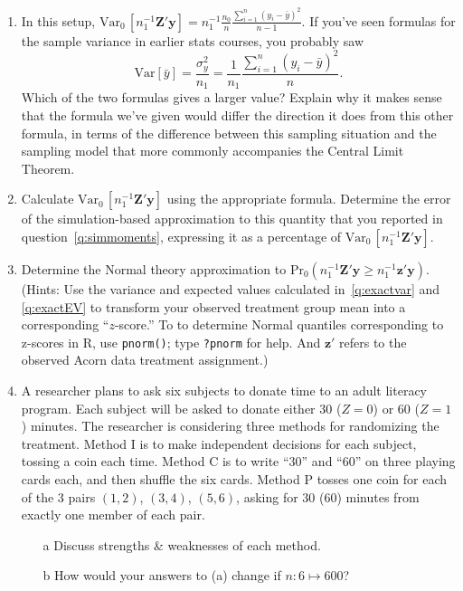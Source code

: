 \documentclass{article}
\begin{document}
\begin{enumerate}
\item In this setup, $\mathrm{Var}_{0}\, [n_{1}^{-1}\mathbf{Z}'\mathbf{y}]  = n_{1}^{-1}
  \frac{n_{0}}{n} \frac{\sum_{i=1}^{n} (y_{i} - \bar y)^{2}}{n-1} $.
  If you've seen formulas for the sample variance in earlier stats
  courses, you probably saw
  $$
  \mathrm{Var} \left[\bar{y}\right] = \frac{\sigma_{y}^{2}}{n_{1}} = \frac{1}{n_{1}}
  \frac{\sum_{i=1}^{n} (y_{i} - \bar y)^{2}}{n} .
  $$
Which of the two formulas gives a larger value?  Explain why it makes
sense that the formula we've given would differ the direction it does
from this other formula, in terms of the difference between this
sampling situation and the sampling model that more commonly
accompanies the Central Limit Theorem.
\item Calculate $\mathrm{Var}_{0}\, [n_{1}^{-1}\mathbf{Z}'\mathbf{y}]$ using the appropriate
  formula.   Determine the error of the simulation-based
  approximation to this quantity that you reported in question~\ref{q:simmoments},
  expressing it as a percentage of $\mathrm{Var}_{0}\,[ n_{1}^{-1}\mathbf{Z}'\mathbf{y}]$. \label{q:exactvar}
\item Determine the Normal theory approximation to
  $\mathrm{Pr}_{0}(n_{1}^{-1}\mathbf{Z}'\mathbf{y} \geq
  n_{1}^{-1}\mathbf{z}'\mathbf{y} ) $.  (Hints: Use the variance and
  expected values calculated in~\ref{q:exactvar} and \ref{q:exactEV} to transform your
  observed treatment group mean into a corresponding ``$z$-score.'' 
  To to determine Normal quantiles corresponding to z-scores in R, use
  \texttt{pnorm()}; type \texttt{?pnorm} for help. And $\mathbf{z}'$ refers to
  the observed Acorn data treatment assignment.)
\item %
A researcher plans to ask six subjects to donate time to an adult
literacy program. Each subject will be asked to donate either 30
($Z=0$) or 60 ($Z=1$)
minutes. The researcher is considering three methods for randomizing
the treatment. Method I is to make independent decisions for each
subject, tossing a coin each time. Method C is to
write ``30'' and ``60'' on three playing cards each, and then shuffle
the six cards. Method P tosses one coin for each of the 3 pairs
$(1,2)$, $(3,4)$, $(5,6)$, asking for 30 (60) minutes from exactly one
member of each pair. 
  \begin{minipage}{.45\linewidth}
\begin{itemize}
\item[a] Discuss strengths \& weaknesses of each method.
\item[b] How would your answers to (a) change if $n: 6 \mapsto 600$?

\end{itemize}
\end{minipage}
\end{enumerate}
\end{document}
